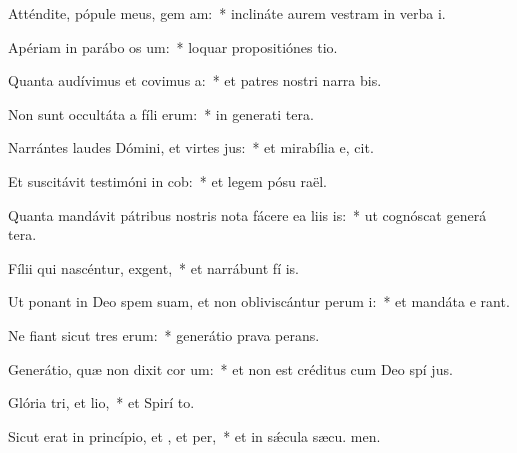 \item Atténdite, pópule meus, gem am:~* inclináte aurem vestram in verba  i.
\item Apériam in parábo os um:~* loquar propositiónes  tio.
\item Quanta audívimus et covimus a:~* et patres nostri narra bis.
\item Non sunt occultáta a fíli erum:~* in generati tera.
\item Narrántes laudes Dómini, et virtes jus:~* et mirabília e,  cit.
\item Et suscitávit testimóni in cob:~* et legem pósu  raël.
\item Quanta mandávit pátribus nostris nota fácere ea liis is:~* ut cognóscat generá tera.
\item Fílii qui nascéntur,  exgent,~* et narrábunt fí is.
\item Ut ponant in Deo spem suam, et non obliviscántur perum i:~* et mandáta e rant.
\item Ne fiant sicut tres erum:~* generátio prava  perans.
\item Generátio, quæ non dixit cor um:~* et non est créditus cum Deo spí jus.
\item Glória tri, et lio,~* et Spirí to.
\item Sicut erat in princípio, et , et per,~* et in sǽcula sæcu. men.

